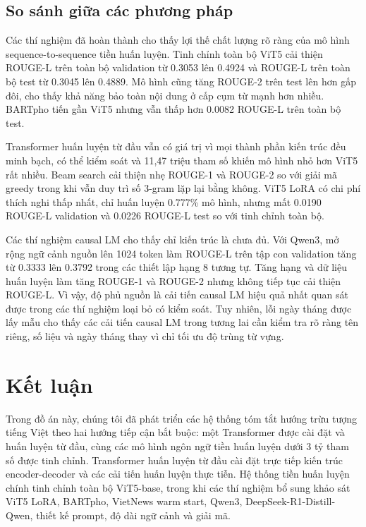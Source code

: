 \documentclass[conference]{IEEEtran}
\begin{document}
\subsection{So sánh giữa các phương pháp}
Các thí nghiệm đã hoàn thành cho thấy lợi thế chất lượng rõ ràng của mô hình sequence-to-sequence tiền huấn luyện. Tinh chỉnh toàn bộ ViT5 cải thiện ROUGE-L trên toàn bộ validation từ 0.3053 lên 0.4924 và ROUGE-L trên toàn bộ test từ 0.3045 lên 0.4889. Mô hình cũng tăng ROUGE-2 trên test lên hơn gấp đôi, cho thấy khả năng bảo toàn nội dung ở cấp cụm từ mạnh hơn nhiều. BARTpho tiến gần ViT5 nhưng vẫn thấp hơn 0.0082 ROUGE-L trên toàn bộ test.

Transformer huấn luyện từ đầu vẫn có giá trị vì mọi thành phần kiến trúc đều minh bạch, có thể kiểm soát và 11,47 triệu tham số khiến mô hình nhỏ hơn ViT5 rất nhiều. Beam search cải thiện nhẹ ROUGE-1 và ROUGE-2 so với giải mã greedy trong khi vẫn duy trì số 3-gram lặp lại bằng không. ViT5 LoRA có chi phí thích nghi thấp nhất, chỉ huấn luyện 0.777\% mô hình, nhưng mất 0.0190 ROUGE-L validation và 0.0226 ROUGE-L test so với tinh chỉnh toàn bộ.

Các thí nghiệm causal LM cho thấy chỉ kiến trúc là chưa đủ. Với Qwen3, mở rộng ngữ cảnh nguồn lên 1024 token làm ROUGE-L trên tập con validation tăng từ 0.3333 lên 0.3792 trong các thiết lập hạng 8 tương tự. Tăng hạng và dữ liệu huấn luyện làm tăng ROUGE-1 và ROUGE-2 nhưng không tiếp tục cải thiện ROUGE-L. Vì vậy, độ phủ nguồn là cải tiến causal LM hiệu quả nhất quan sát được trong các thí nghiệm loại bỏ có kiểm soát. Tuy nhiên, lỗi ngày tháng được lấy mẫu cho thấy các cải tiến causal LM trong tương lai cần kiểm tra rõ ràng tên riêng, số liệu và ngày tháng thay vì chỉ tối ưu độ trùng từ vựng.

\section{Kết luận}
Trong đồ án này, chúng tôi đã phát triển các hệ thống tóm tắt hướng trừu tượng tiếng Việt theo hai hướng tiếp cận bắt buộc: một Transformer được cài đặt và huấn luyện từ đầu, cùng các mô hình ngôn ngữ tiền huấn luyện dưới 3 tỷ tham số được tinh chỉnh. Transformer huấn luyện từ đầu cài đặt trực tiếp kiến trúc encoder-decoder và các cải tiến huấn luyện thực tiễn. Hệ thống tiền huấn luyện chính tinh chỉnh toàn bộ ViT5-base, trong khi các thí nghiệm bổ sung khảo sát ViT5 LoRA, BARTpho, VietNews warm start, Qwen3, DeepSeek-R1-Distill-Qwen, thiết kế prompt, độ dài ngữ cảnh và giải mã.
\end{document}
